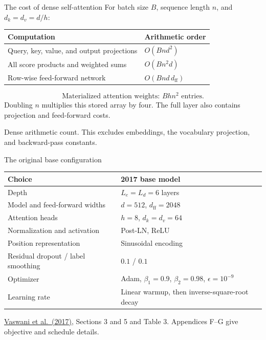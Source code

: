 \documentclass[aspectratio=169,11pt]{beamer}
\newcommand{\src}[1]{\par\vfill{\fontsize{7}{8.5}\selectfont\color{muted}#1}\par}
\newcommand{\paper}{\href{https://arxiv.org/abs/1706.03762}{Vaswani et al.\ (2017)}}
\begin{document}
\begin{frame}[t]{The cost of dense self-attention}
For batch size $B$, sequence length $n$, and $d_k=d_v=d/h$:
\small
\begin{tabularx}{\textwidth}{@{}lX@{}}
\toprule
Computation & Arithmetic order \\
\midrule
Query, key, value, and output projections & $O(Bnd^2)$ \\
All score products and weighted sums & $O(Bn^2d)$ \\
Row-wise feed-forward network & $O(Bn d\,d_{\mathrm{ff}})$ \\
\bottomrule
\end{tabularx}
\normalsize
\vspace{2mm}
\[
 \text{Materialized attention weights: }Bhn^2\text{ entries}.
\]
Doubling $n$ multiplies this stored array by four.
The full layer also contains projection and feed-forward costs.
\src{Dense arithmetic count. This excludes embeddings, the vocabulary projection, and backward-pass constants.}
\end{frame}

\begin{frame}[t]{The original base configuration}
\small
\begin{tabularx}{\textwidth}{@{}lX@{}}
\toprule
Choice & 2017 base model \\
\midrule
Depth & $L_e=L_d=6$ layers \\
Model and feed-forward widths & $d=512$, $d_{\mathrm{ff}}=2048$ \\
Attention heads & $h=8$, $d_k=d_v=64$ \\
Normalization and activation & Post-LN, ReLU \\
Position representation & Sinusoidal encoding \\
Residual dropout / label smoothing & $0.1$ / $0.1$ \\
Optimizer & Adam, $\beta_1=0.9$, $\beta_2=0.98$, $\epsilon=10^{-9}$ \\
Learning rate & Linear warmup, then inverse-square-root decay \\
\bottomrule
\end{tabularx}
\src{\paper, Sections 3 and 5 and Table 3. Appendices F--G give objective and schedule details.}
\end{frame}
\end{document}
